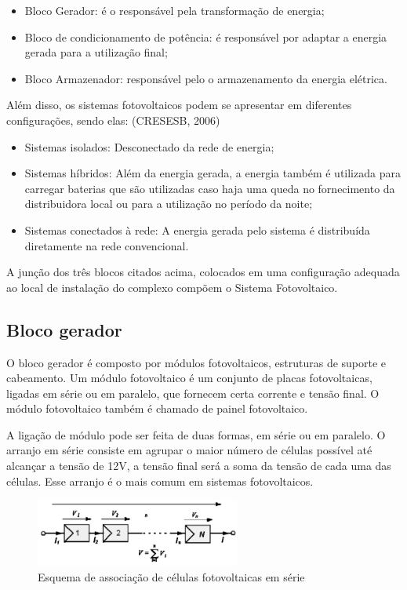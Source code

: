 \begin{itemize}
\item Bloco Gerador: é o responsável pela transformação de energia;
\item Bloco de condicionamento de potência: é responsável por adaptar a energia gerada para a utilização final;
\item Bloco Armazenador: responsável pelo o armazenamento da energia elétrica.
\end{itemize}

Além disso, os sistemas fotovoltaicos podem se apresentar em diferentes configurações, sendo elas: (CRESESB, 2006)

\begin{itemize}
\item Sistemas isolados: Desconectado da rede de energia;
\item Sistemas híbridos: Além da energia gerada, a energia também é utilizada para carregar baterias que são utilizadas caso haja uma queda no fornecimento da distribuidora local ou para a utilização no período da noite;
\item Sistemas conectados à rede: A energia gerada pelo sistema é distribuída diretamente na rede convencional.
\end{itemize}

A junção dos três blocos citados acima, colocados em uma configuração adequada ao local de instalação do complexo compõem o Sistema Fotovoltaico. 

\subsection{Bloco gerador}
O bloco gerador é composto por módulos fotovoltaicos, estruturas de suporte e cabeamento. Um módulo fotovoltaico é um conjunto de placas fotovoltaicas, ligadas em série ou em paralelo, que fornecem certa corrente e tensão final. O módulo fotovoltaico também é chamado de painel fotovoltaico.

\par A ligação de módulo pode ser feita de duas formas, em série ou em paralelo. O arranjo em série consiste em agrupar o maior número de células possível até alcançar a tensão de 12V, a tensão final será a soma da tensão de cada uma das células. Esse arranjo é o mais comum em sistemas fotovoltaicos.

\begin{figure}[!h]
\centering
\includegraphics[width=0.6\textwidth]{figuras/associacao.png}
\caption{Esquema de associação de células fotovoltaicas em série}
\end{figure}

